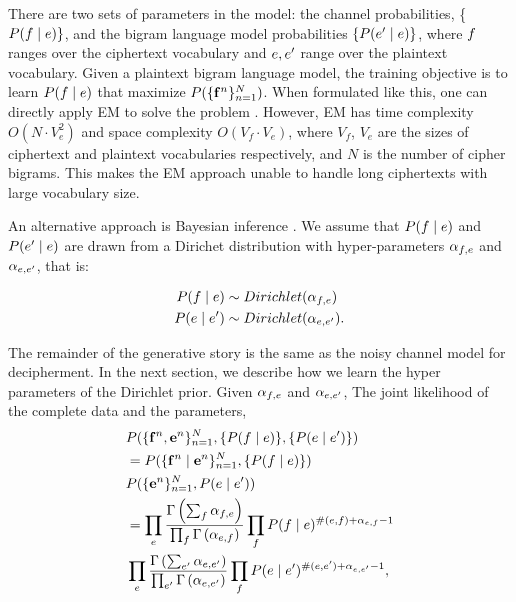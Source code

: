 There are two sets of parameters in the model: the channel probabilities, \{ $P(f \mid e) \} $, and the bigram language model probabilities $\{ P(e' \mid e) \} $, where $f$ ranges over the ciphertext vocabulary and $e,e'$ range over the plaintext vocabulary. Given a plaintext bigram language model, the training objective is to learn $P(f \mid e)$ that maximize $P( \{ \mathbf{f}^n \}_{n=1}^{N} )$. When formulated like this, one can directly apply EM to solve the problem \cite{knight-EtAl:2006}. However, EM has time complexity $O( N\cdot V_{e}^{2})$ and space complexity $O(V_{f}\cdot V_{e})$, where $V_{f}$, $V_{e}$ are the sizes of ciphertext and plaintext vocabularies respectively, and $N$ is the number of cipher bigrams. This makes the EM approach unable to handle long ciphertexts with large vocabulary size. 

An alternative approach is Bayesian inference \cite{ravi-knight:2011}. We assume that $P(f \mid e)$ and $P(e' \mid e)$ are drawn from a Dirichet distribution with hyper-parameters $\alpha_{f,e}$ and $\alpha_{e,e'}$, that is: 

\begin{align*}
P(f \mid e) & \sim Dirichlet(\alpha_{f,e}) \\ 
P(e \mid e') & \sim Dirichlet(\alpha_{e,e'}).
\end{align*}

The remainder of the generative story is the same as the noisy channel model for decipherment. In the next section, we describe how we learn the hyper parameters of the Dirichlet prior. Given $\alpha_{f,e}$ and $\alpha_{e,e'}$, The joint likelihood of the complete data and the parameters,
\begin{align} \label{joint_likelihood}
&P( \{ \mathbf{f}^n , \mathbf{e}^n \}_{n=1}^{N}, \{ P(f \mid e) \}, \{ P(e \mid e') \} )  \notag \\
 &= P( \{ \mathbf{f}^n \mid \mathbf{e}^n \}_{n=1}^{N}, \{ P(f \mid e) \}) \notag \\
     &P(  \{  \mathbf{e}^n \}_{n=1}^{N},P(e \mid e')) \notag \notag \\
 &= \prod_{e}  \frac{\Gamma \left( \sum_{f} \alpha_{f,e} \right)} {\prod_{f} \Gamma \left( \alpha_{e,f} \right)} \prod_{f} P(f \mid e)^{\#(e,f)+\alpha_{e,f} -1}  \notag \\
  &\prod_{e}  \frac{\Gamma \left( \sum_{e'} \alpha_{e,e'} \right)} {\prod_{e'} \Gamma \left( \alpha_{e,e'} \right)} \prod_{f} P(e \mid e')^{\#(e,e')+\alpha_{e,e'} -1} , 
\end{align}

